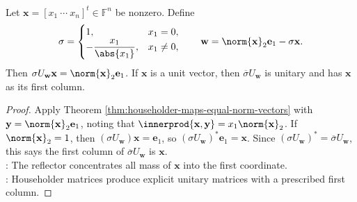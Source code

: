 \begin{corollary} \label{cor:householder-unitary-annihilator} \\
Let $\mathbf{x}=[x_1\ \cdots\ x_n]^t\in\mathbb{F}^n$ be nonzero. Define
\begin{align}
\sigma=
\begin{cases}
1, & x_1=0,\\
-\dfrac{x_1}{\abs{x_1}}, & x_1\neq0,
\end{cases}
\qquad
\mathbf{w}=\norm{\mathbf{x}}_2\mathbf{e}_1-\sigma\mathbf{x}.
\nonumber
\end{align}
Then $\sigma U_{\mathbf{w}}\mathbf{x}=\norm{\mathbf{x}}_2\mathbf{e}_1$. If $\mathbf{x}$ is a unit vector, then $\overline{\sigma}U_{\mathbf{w}}$ is unitary and has $\mathbf{x}$ as its first column.
\begin{proof}
Apply Theorem \ref{thm:householder-maps-equal-norm-vectors} with $\mathbf{y}=\norm{\mathbf{x}}_2\mathbf{e}_1$, noting that $\innerprod{\mathbf{x},\mathbf{y}}=x_1\norm{\mathbf{x}}_2$. If $\norm{\mathbf{x}}_2=1$, then $(\sigma U_{\mathbf{w}})\mathbf{x}=\mathbf{e}_1$, so $(\sigma U_{\mathbf{w}})^*\mathbf{e}_1=\mathbf{x}$. Since $(\sigma U_{\mathbf{w}})^*=\overline{\sigma}U_{\mathbf{w}}$, this says the first column of $\overline{\sigma}U_{\mathbf{w}}$ is $\mathbf{x}$.\\
: The reflector concentrates all mass of $\mathbf{x}$ into the first coordinate.\\
: Householder matrices produce explicit unitary matrices with a prescribed first column.
\end{proof}
\end{corollary}
